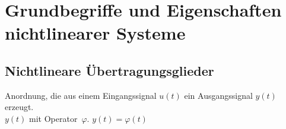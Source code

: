 \documentclass[11pt,a4paper]{article}
\date{15.10.2014}
\author{Dr.-Ing. J. Winkler}
\begin{document}
\setlength{\parindent}{0pt}
\setcounter{secnumdepth}{4}
\maketitle
\tableofcontents
\newpage
\section{Grundbegriffe und Eigenschaften nichtlinearer Systeme}
\subsection{Nichtlineare Übertragungsglieder}
Anordnung, die aus einem Eingangssignal $u(t)$ ein Ausgangssignal $y(t)$ erzeugt. \\$y(t)$ mit Operator~$\varphi.$ \hspace{1cm} $y(t)=\varphi(t)$ \newline
\end{document}
